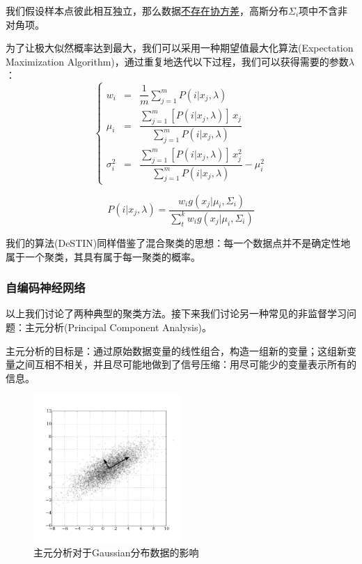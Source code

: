 我们假设样本点彼此相互独立，那么数据\uline{不存在协方差}，高斯分布$\Sigma_i$项中不含非对角项。

为了让极大似然概率达到最大，我们可以采用一种期望值最大化算法(Expectation Maximization Algorithm)，通过重复地迭代以下过程，我们可以获得需要的参数$\lambda$：
\begin{equation}
\left\{
\begin{aligned}
w_i & = & \dfrac{1}{m} \sum^m_{j=1} P(i|x_j, \lambda)\\
\mu_i & = & \dfrac{\sum^m_{j=1} [P(i|x_j, \lambda)]\, x_j}{\sum^m_{j=1} P(i|x_j, \lambda)} \\
\sigma^2_i & = & \dfrac{\sum^m_{j=1} [P(i|x_j, \lambda)]\, x_j^2}{\sum^m_{j=1} P(i|x_j, \lambda)} - \mu^2_i
\end{aligned}
\right.
\end{equation}

\begin{equation}
P(i|x_j, \lambda) = \dfrac{w_i g(x_j|\mu_i, \Sigma_i)}{\sum^k_t w_i g(x_j|\mu_i, \Sigma_i)} 
\end{equation}

我们的算法(DeSTIN)同样借鉴了混合聚类的思想：每一个数据点并不是确定性地属于一个聚类，其具有属于每一聚类的概率。

\subsubsection{自编码神经网络}

以上我们讨论了两种典型的聚类方法。接下来我们讨论另一种常见的非监督学习问题：主元分析(Principal Component Analysis)。 

主元分析的目标是：通过原始数据变量的线性组合，构造一组新的变量；这组新变量之间互相不相关，并且尽可能地做到了信号压缩：用尽可能少的变量表示所有的信息。

\begin{figure}[htbp]
   \centering
   \includegraphics[width=0.5\textwidth]{PCAGaussian.png} %
   \caption{主元分析对于Gaussian分布数据的影响}
   \label{fig:pca}
\end{figure}

